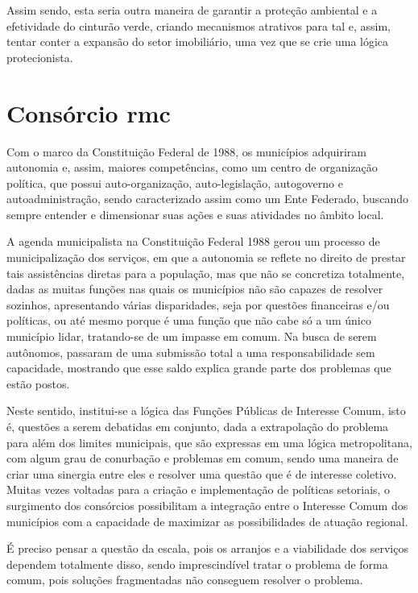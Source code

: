 	Assim sendo, esta seria outra maneira de garantir a proteção ambiental e a efetividade do cinturão verde, criando mecanismos atrativos para tal e, assim, tentar conter a expansão do setor imobiliário, uma vez que se crie uma lógica protecionista. 
		
	\section{Consórcio \glsdesc{rmc}}
	
	Com o marco da Constituição Federal de 1988, os municípios adquiriram autonomia e, assim, maiores competências, como um centro de organização política, que possui auto-organização, auto-legislação, autogoverno e autoadministração, sendo caracterizado assim como um Ente Federado, buscando sempre entender e dimensionar suas ações e suas atividades no âmbito local.
	
	A agenda municipalista na Constituição Federal 1988 gerou um processo de municipalização dos serviços, em que a autonomia se reflete no direito de prestar tais assistências diretas para a população, mas que não se concretiza totalmente, dadas as muitas funções nas quais os municípios não são capazes de resolver sozinhos, apresentando várias disparidades, seja por questões financeiras e/ou políticas, ou até mesmo porque é uma função que não cabe só a um único município lidar, tratando-se de um impasse em comum. Na busca de serem autônomos, passaram de uma submissão total a uma responsabilidade sem capacidade, mostrando que esse saldo explica grande parte dos problemas que estão postos. 
	
	Neste sentido, institui-se a lógica das Funções Públicas de Interesse Comum, isto é, questões a serem debatidas em conjunto, dada a extrapolação do problema para além dos limites municipais, que são expressas em uma lógica metropolitana, com algum grau de conurbação e problemas em comum, sendo uma maneira de criar uma sinergia entre eles e resolver uma questão que é de interesse coletivo. Muitas vezes voltadas para a criação e implementação de políticas setoriais, o surgimento dos consórcios possibilitam a integração entre o Interesse Comum dos municípios com a capacidade de maximizar as possibilidades de atuação regional.
	
	É preciso pensar a questão da escala, pois os arranjos e a viabilidade dos serviços dependem totalmente disso, sendo imprescindível tratar o problema de forma comum, pois soluções fragmentadas não conseguem resolver o problema. 
	
